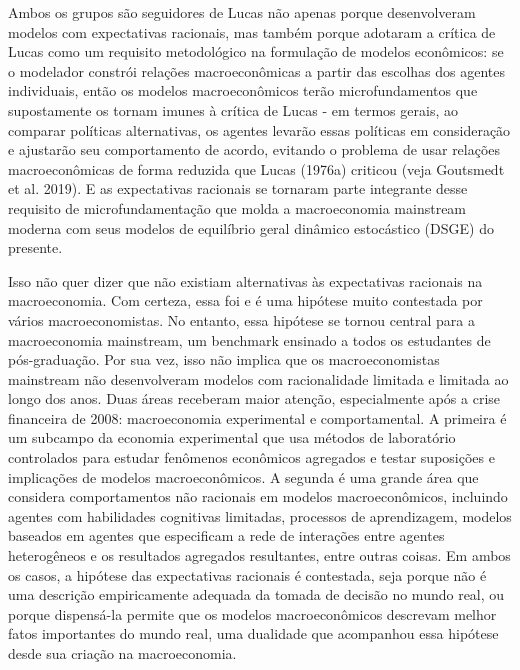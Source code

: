 \documentclass[a4paper,12pt]{article}[abntex2]
\begin{document}
Ambos os grupos são seguidores de Lucas não apenas porque desenvolveram modelos com expectativas racionais, mas também porque adotaram a crítica de Lucas como um requisito metodológico na formulação de modelos econômicos: se o modelador constrói relações macroeconômicas a partir das escolhas dos agentes individuais, então os modelos macroeconômicos terão microfundamentos que supostamente os tornam imunes à crítica de Lucas - em termos gerais, ao comparar políticas alternativas, os agentes levarão essas políticas em consideração e ajustarão seu comportamento de acordo, evitando o problema de usar relações macroeconômicas de forma reduzida que Lucas (1976a) criticou (veja Goutsmedt et al. 2019). E as expectativas racionais se tornaram parte integrante desse requisito de microfundamentação que molda a macroeconomia mainstream moderna com seus modelos de equilíbrio geral dinâmico estocástico (DSGE) do presente.

Isso não quer dizer que não existiam alternativas às expectativas racionais na macroeconomia. Com certeza, essa foi e é uma hipótese muito contestada por vários macroeconomistas. No entanto, essa hipótese se tornou central para a macroeconomia mainstream, um benchmark ensinado a todos os estudantes de pós-graduação. Por sua vez, isso não implica que os macroeconomistas mainstream não desenvolveram modelos com racionalidade limitada e limitada ao longo dos anos. Duas áreas receberam maior atenção, especialmente após a crise financeira de 2008: macroeconomia experimental e comportamental. A primeira é um subcampo da economia experimental que usa métodos de laboratório controlados para estudar fenômenos econômicos agregados e testar suposições e implicações de modelos macroeconômicos. A segunda é uma grande área que considera comportamentos não racionais em modelos macroeconômicos, incluindo agentes com habilidades cognitivas limitadas, processos de aprendizagem, modelos baseados em agentes que especificam a rede de interações entre agentes heterogêneos e os resultados agregados resultantes, entre outras coisas. Em ambos os casos, a hipótese das expectativas racionais é contestada, seja porque não é uma descrição empiricamente adequada da tomada de decisão no mundo real, ou porque dispensá-la permite que os modelos macroeconômicos descrevam melhor fatos importantes do mundo real, uma dualidade que acompanhou essa hipótese desde sua criação na macroeconomia.
\end{document}
